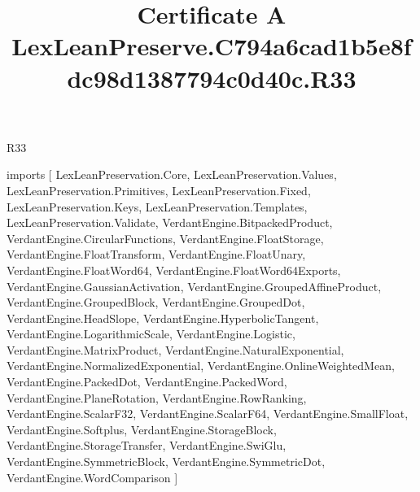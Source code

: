 \begin{lexlean}{R33}
\title{Certificate A LexLeanPreserve.C794a6cad1b5e8fdc98d1387794c0d40c.R33}
\begin{coremodule}
imports [
  LexLeanPreservation.Core,
  LexLeanPreservation.Values,
  LexLeanPreservation.Primitives,
  LexLeanPreservation.Fixed,
  LexLeanPreservation.Keys,
  LexLeanPreservation.Templates,
  LexLeanPreservation.Validate,
  VerdantEngine.BitpackedProduct,
  VerdantEngine.CircularFunctions,
  VerdantEngine.FloatStorage,
  VerdantEngine.FloatTransform,
  VerdantEngine.FloatUnary,
  VerdantEngine.FloatWord64,
  VerdantEngine.FloatWord64Exports,
  VerdantEngine.GaussianActivation,
  VerdantEngine.GroupedAffineProduct,
  VerdantEngine.GroupedBlock,
  VerdantEngine.GroupedDot,
  VerdantEngine.HeadSlope,
  VerdantEngine.HyperbolicTangent,
  VerdantEngine.LogarithmicScale,
  VerdantEngine.Logistic,
  VerdantEngine.MatrixProduct,
  VerdantEngine.NaturalExponential,
  VerdantEngine.NormalizedExponential,
  VerdantEngine.OnlineWeightedMean,
  VerdantEngine.PackedDot,
  VerdantEngine.PackedWord,
  VerdantEngine.PlaneRotation,
  VerdantEngine.RowRanking,
  VerdantEngine.ScalarF32,
  VerdantEngine.ScalarF64,
  VerdantEngine.SmallFloat,
  VerdantEngine.Softplus,
  VerdantEngine.StorageBlock,
  VerdantEngine.StorageTransfer,
  VerdantEngine.SwiGlu,
  VerdantEngine.SymmetricBlock,
  VerdantEngine.SymmetricDot,
  VerdantEngine.WordComparison
]


\end{coremodule}
\end{lexlean}
